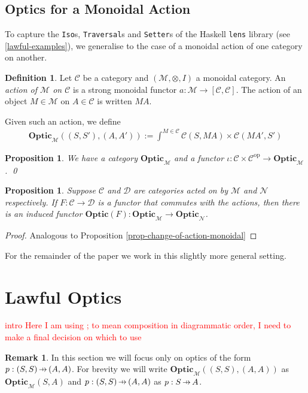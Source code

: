 \documentclass[11pt,a4paper]{article}
\theoremstyle{plain}
\newtheorem{proposition}[theorem]{Proposition}
\theoremstyle{definition}
\newtheorem{definition}[theorem]{Definition}
\newtheorem{remark}[theorem]{Remark}
\newcommand{\C}{\mathscr{C}}
\newcommand{\D}{\mathscr{D}}
\newcommand{\M}{\mathscr{M}}
\newcommand{\N}{\mathscr{N}}
\newcommand{\Optic}{\mathbf{Optic}}
\newcommand{\op}{\mathrm{op}}
\newcommand{\hto}{\ensuremath{\,\mathaccent\shortmid\rightarrow\,}}
\newcommand{\todo}[1]{\textcolor{red}{\small #1}}
\begin{document}
\subsection{Optics for a Monoidal Action}

To capture the \texttt{Iso}s, \texttt{Traversal}s and \texttt{Setter}s of the Haskell \texttt{lens} library (see \ref{lawful-examples}), we generalise to the case of a monoidal action of one category on another.

\begin{definition}
Let $\C$ be a category and $(\M, \otimes, I)$ a monoidal category. An \emph{action of $\M$ on $\C$} is a strong monoidal functor $a : \M \to [\C, \C]$. The action of an object $M \in \M$ on $A \in \C$ is written $MA$.
\end{definition}

Given such an action, we define 
\begin{align*}
\Optic_\M((S, S'), (A, A')) := \int^{M \in \C} \C(S, MA) \times \C(MA', S')
\end{align*}

\begin{proposition}
We have a category $\Optic_\M$ and a functor $\iota : \C \times \C^\op \to \Optic_\M$. \qed
\end{proposition}

\begin{proposition}
\label{prop-change-of-action}
Suppose $\C$ and $\D$ are categories acted on by $\M$ and $\mathcal{N}$ respectively. If $F : \C \to \D$ is a functor that commutes with the actions, then there is an induced functor $\Optic(F) : \Optic_\M \to \Optic_\N$.
\end{proposition}
\begin{proof}
Analogous to Proposition \ref{prop-change-of-action-monoidal}
\end{proof}

For the remainder of the paper we work in this slightly more general setting.

\section{Lawful Optics}
\todo{intro}
\todo{Here I am using ; to mean composition in diagrammatic order, I need to make a final decision on which to use}

\begin{remark}
In this section we will focus only on optics of the form $p : (S,S) \hto (A, A)$. For brevity we will write $\Optic_\M((S, S), (A, A))$ as $\Optic_\M(S, A)$ and $p : (S, S) \hto (A, A)$ as $p : S \hto A$.
\end{remark}
\end{document}
